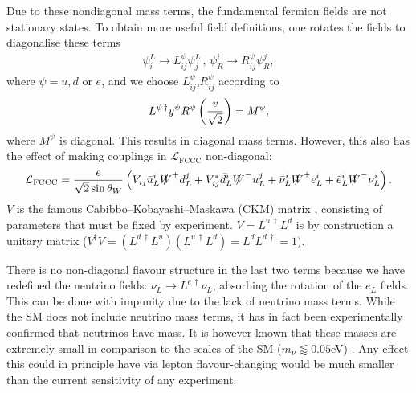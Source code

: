 Due to these nondiagonal mass terms, the fundamental fermion fields are not stationary states. To obtain more useful field definitions, one rotates the fields to diagonalise these terms
\begin{align}
  \psi^L_i\to L^{\psi}_{ij} \psi^L_j \,,\, \psi_R^i \to R^{\psi}_{ij} \psi_R^j,
\end{align}
where $\psi=u,d$ or $e$, and we choose $L^{\psi}_{ij}$,$R^{\psi}_{ij}$ according to
\begin{align}
  L^{\psi\,\dagger} y^{\psi} R^{\psi} \left({v\over \sqrt{2}}\right)= M^{\psi},
\end{align}
where $M^{\psi}$ is diagonal. This results in diagonal mass terms. However, this also has the effect of making couplings in $\mathcal{L}_{\text{FCCC}}$ non-diagonal:
\begin{align}
  \mathcal{L}_{\text{FCCC}} = {e\over \sqrt{2}\sin\theta_W} \left( V_{ij} \bar{u}_L^i \slashed{W}^+  d_L^j + V_{ij}^* \bar{d}_L^i \slashed{W}^- u_L^j + \bar{\nu}_L^i \slashed{W}^+ e_L^i + \bar{e}_L^i \slashed{W}^- \nu_L^i \right).
  \label{eq:FCCC}
\end{align}
 $V$ is the famous Cabibbo–Kobayashi–Maskawa (CKM) matrix \cite{PhysRevLett.10.531,10.1143/PTP.49.652}, consisting of parameters that must be fixed by experiment. $V = L^{u\,\dagger} L^d$ is by construction a unitary matrix ($V^{\dagger}V = (L^{d\,\dagger} L^u)(L^{u\,\dagger} L^d) = L^d L^{d\,\dagger} = 1)$.

There is no non-diagonal flavour structure in the last two terms because we have redefined the neutrino fields: $\nu_L \to L^{e\,\dagger} \nu_L$, absorbing the rotation of the $e_L$ fields. This can be done with impunity due to the lack of neutrino mass terms. While the SM does not include neutrino mass terms, it has in fact been experimentally confirmed that neutrinos have mass. It is however known that these masses are extremely small in comparison to the scales of the SM ($m_{\nu}\lessapprox 0.05$eV) \cite{GONZALEZGARCIA20081}. Any effect this could in principle have via lepton flavour-changing would be much smaller than the current sensitivity of any experiment. %

